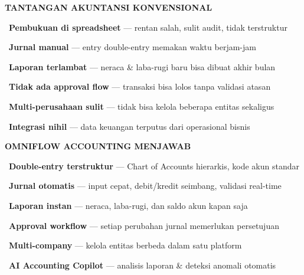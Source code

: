 \documentclass[a4paper]{article}
\begin{document}
\noindent
\begin{minipage}[t]{0.485\textwidth}
    \colorbox{RedLight}{%
        \begin{minipage}{\dimexpr\textwidth-2\fboxsep\relax}
            {\fontsize{10}{13}\selectfont\bfseries\color{RedText} TANTANGAN AKUNTANSI KONVENSIONAL}
        \end{minipage}}\par
    \vspace{4pt}

    {\fontsize{9.5}{13}\selectfont\color{TextDark}%
    \textbullet\ \textbf{Pembukuan di spreadsheet} — rentan salah, sulit audit, tidak terstruktur\par\vspace{4pt}%
    \textbullet\ \textbf{Jurnal manual} — entry double-entry memakan waktu berjam-jam\par\vspace{4pt}%
    \textbullet\ \textbf{Laporan terlambat} — neraca \& laba-rugi baru bisa dibuat akhir bulan\par\vspace{4pt}%
    \textbullet\ \textbf{Tidak ada approval flow} — transaksi bisa lolos tanpa validasi atasan\par\vspace{4pt}%
    \textbullet\ \textbf{Multi-perusahaan sulit} — tidak bisa kelola beberapa entitas sekaligus\par\vspace{4pt}%
    \textbullet\ \textbf{Integrasi nihil} — data keuangan terputus dari operasional bisnis}%
\end{minipage}%
\hfill%
\begin{minipage}[t]{0.485\textwidth}
    \colorbox{TealPrimary}{%
        \begin{minipage}{\dimexpr\textwidth-2\fboxsep\relax}
            {\fontsize{10}{13}\selectfont\bfseries\color{White} OMNIFLOW ACCOUNTING MENJAWAB}
        \end{minipage}}\par
    \vspace{4pt}

    {\fontsize{9.5}{13}\selectfont\color{TextDark}%
    \textbullet\ \textbf{Double-entry terstruktur} — Chart of Accounts hierarkis, kode akun standar\par\vspace{4pt}%
    \textbullet\ \textbf{Jurnal otomatis} — input cepat, debit/kredit seimbang, validasi real-time\par\vspace{4pt}%
    \textbullet\ \textbf{Laporan instan} — neraca, laba-rugi, dan saldo akun kapan saja\par\vspace{4pt}%
    \textbullet\ \textbf{Approval workflow} — setiap perubahan jurnal memerlukan persetujuan\par\vspace{4pt}%
    \textbullet\ \textbf{Multi-company} — kelola entitas berbeda dalam satu platform\par\vspace{4pt}%
    \textbullet\ \textbf{AI Accounting Copilot} — analisis laporan \& deteksi anomali otomatis}%
\end{minipage}
\end{document}
